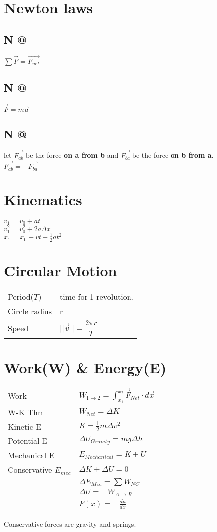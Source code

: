 \documentclass[5pt]{article}
\makeatletter
\newcommand*{\rom}[1]{\expandafter\@slowromancap\romannumeral #1@}
\makeatother
\begin{document}
\begin{multicols}{3}
\section{Newton laws}
\subsection{N \rom{1}}
$\sum{\vec{F} = \vec{F_{net}}}$
\subsection{N \rom{2}}
$\vec{F}=m\vec{a}$
\subsection{N \rom{3}}
let $\vec{F_{ab}}$ be the force \textbf{on a from b} and $\vec{F_{ba}}$ be the force \textbf{on b from a}.\\
$\vec{F_{ab}}=\vec{-F_{ba}}$


\section{Kinematics}
$v_1=v_0+at$\\
$v_1^2=v_0^2+2a\Delta x$\\
$x_1=x_0 + vt + \frac{1}{2}at^2$

\section{Circular Motion}
\begin{tabular}{ll}
Period($T$) & time for 1 revolution.\\
Circle radius & r\\
Speed & $||\Vec{v}||=\dfrac{2\pi r}{T}$
\end{tabular}

\section{Work(W) \& Energy(E)}
\begin{tabular}{ll}
Work & $W_{1\to 2}=\int_{x_1}^{x_2}\Vec{F}_{Net}\cdot d\Vec{x}$\\
W-K Thm & $W_{Net}=\Delta K$\\
Kinetic E & $K=\frac{1}{2}m\Delta v^2$\\
Potential E & $\Delta U_{Gravity}=mg\Delta h$\\
Mechanical E & $E_{Mechanical}=K+U$\\
\footnotesize{Conservative $E_{mec}$} & $\Delta K+\Delta U=0$\\
& $\Delta E_{Mec}=\sum W_{NC}$\\
& $\Delta U = - W_{A\to B}$\\
& $F(x)=-\frac{du}{dx}$
\end{tabular}
Conservative forces  are gravity and springs.


\end{multicols}
\end{document}
